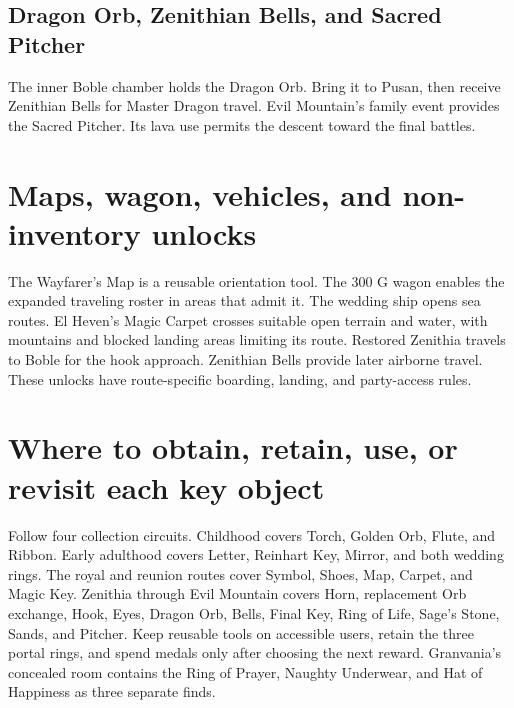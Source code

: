 \subsection{Dragon Orb, Zenithian Bells, and Sacred Pitcher}
The inner Boble chamber holds the Dragon Orb. Bring it to Pusan, then receive Zenithian Bells for Master Dragon travel. Evil Mountain's family event provides the Sacred Pitcher. Its lava use permits the descent toward the final battles.

\section{Maps, wagon, vehicles, and non-inventory unlocks}
The Wayfarer's Map is a reusable orientation tool. The 300 G wagon enables the expanded traveling roster in areas that admit it. The wedding ship opens sea routes. El Heven's Magic Carpet crosses suitable open terrain and water, with mountains and blocked landing areas limiting its route. Restored Zenithia travels to Boble for the hook approach. Zenithian Bells provide later airborne travel. These unlocks have route-specific boarding, landing, and party-access rules.

\section{Where to obtain, retain, use, or revisit each key object}
Follow four collection circuits. Childhood covers Torch, Golden Orb, Flute, and Ribbon. Early adulthood covers Letter, Reinhart Key, Mirror, and both wedding rings. The royal and reunion routes cover Symbol, Shoes, Map, Carpet, and Magic Key. Zenithia through Evil Mountain covers Horn, replacement Orb exchange, Hook, Eyes, Dragon Orb, Bells, Final Key, Ring of Life, Sage's Stone, Sands, and Pitcher. Keep reusable tools on accessible users, retain the three portal rings, and spend medals only after choosing the next reward. Granvania's concealed room contains the Ring of Prayer, Naughty Underwear, and Hat of Happiness as three separate finds.

